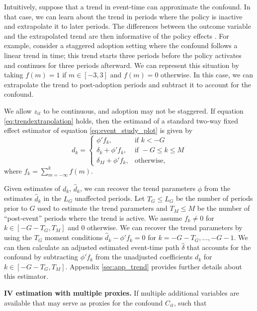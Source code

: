 \documentclass[12pt]{article}
\begin{document}
Intuitively, suppose that a trend in event-time can approximate the confound.
In that case, we can learn about the trend in periods where the policy is inactive and extrapolate it to later periods.
The differences between the outcome variable and the extrapolated trend are then informative of the policy effects \citep{dobkin2018economic}.
For example, consider a staggered adoption setting where the confound follows a linear trend in time; this trend starts three periods before the policy activates and continues for three periods afterward.
We can represent this situation by taking $f(m) = 1$ if $m \in \left[-3,3\right]$ and $f(m)=0$ otherwise. In this case, we can extrapolate the trend to post-adoption periods and subtract it to account for the confound.

We allow $z_{it}$ to be continuous, and adoption may not be staggered.
If equation \eqref{eq:trendextrapolation} holds, then the estimand of a standard two-way fixed effect estimator of equation \eqref{eq:event_study_plot} is given by
\begin{equation}\label{eq:trendcases}
d_k =
\begin{cases}
\phi' f_k, & \mbox{if } k < -G \\
\delta_k + \phi' f_k, & \mbox{if } -G \leq k \leq M \\
\delta_M + \phi'f_k, & \mbox{otherwise},
\end{cases}
\end{equation}
where $f_k = \sum_{m = -\infty}^{k} f(m)$.

Given estimates of $d_k$, $\widehat{d}_k$, we can recover the trend parameters $\phi$ from the estimates $\widehat{d}_k$ in the $L_G$ unaffected periods.
Let $T_G \leq L_G$ be the number of periods prior to $G$ used to estimate the trend parameters and $T_M \leq M$ be the number of ``post-event'' periods where the trend is active.
We assume $f_k \neq 0$ for $k \in \left[-G-T_G,T_M \right]$ and $0$ otherwise.
We can recover the trend parameters by using the $T_G$ moment conditions $\widehat{d}_k - \phi' f_k = 0$ for $k = -G - T_G,\ldots,-G-1$.
We can then calculate an adjusted estimated event-time path $\widehat{\delta}$ that accounts for the confound by subtracting $\phi' f_k$ from the unadjusted coefficients $d_k$ for $k \in \left[-G-T_G,T_M\right]$.
Appendix \ref{sec:app_trend} provides further details about this estimator.

\noindent \textbf{IV estimation with multiple proxies.}
If multiple additional variables are available that may serve as proxies for the confound $C_{it}$, such that
\end{document}
